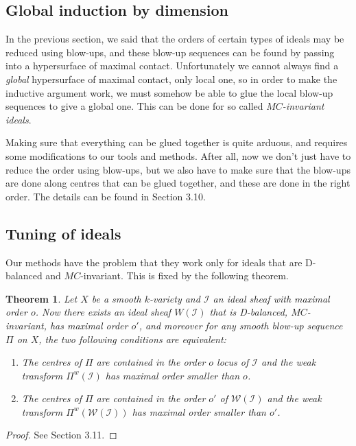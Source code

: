 \documentclass[12pt,a4paper,leqno]{article}
\theoremstyle{plain}
\newtheorem{thm}[theo]{Theorem}
\theoremstyle{definition}
\theoremstyle{remark}
\begin{document}
\subsection{Global induction by dimension}

In the previous section, we said that the orders of certain types of ideals may be reduced using blow-ups, and these blow-up sequences can be found by passing into a hypersurface of maximal contact. Unfortunately we cannot always find a \emph{global} hypersurface of maximal contact, only local one, so in order to make the inductive argument work, we must somehow be able to glue the local blow-up sequences to give a global one. This can be done for so called \emph{$MC$-invariant ideals}.

Making sure that everything can be glued together is quite arduous, and requires some modifications to our tools and methods. After all, now we don't just have to reduce the order using blow-ups, but we also have to make sure that the blow-ups are done along centres that can be glued together, and these are done in the right order. The details can be found in \cite{Kol} Section 3.10.

\subsection{Tuning of ideals}

Our methods have the problem that they work only for ideals that are D-balanced and $MC$-invariant. This is fixed by the following theorem.

\begin{thm}\label{TunedOrderReduction}
Let $X$ be a smooth $k$-variety and $\mathscr{I}$ an ideal sheaf with maximal order $o$. Now there exists an ideal sheaf $W (\mathscr{I})$ that is D-balanced, $MC$-invariant, has maximal order $o'$, and moreover for any smooth blow-up sequence $\Pi$ on $X$, the two following conditions are equivalent:
\begin{enumerate}
\item The centres of $\Pi$ are contained in the order $o$ locus of $\mathscr{I}$ and the weak transform $\Pi^{w} (\mathscr{I})$ has maximal order smaller than $o$.
\item The centres of $\Pi$ are contained in the order $o'$ of $\mathscr{W(I)}$ and the weak transform $\Pi^{w} (\mathscr{W(I)})$ has maximal order smaller than $o'$.
\end{enumerate}
\end{thm}
\begin{proof}
See \cite{Kol} Section 3.11.
\end{proof}
\end{document}
